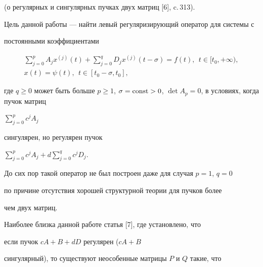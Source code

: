 (о регулярных и сингулярных пучках двух матриц [6], c.\,313).





Цель данной работы --- найти левый регуляризирующий оператор для системы с


постоянными коэффициентами


\begin{gather}


\sum_{j=0}^{p}{A_jx^{(j)}(t)}+


\sum_{j=0}^{q}{D_jx^{(j)}(t-\sigma)}=f(t),\ \ t \in [t_0,+\infty), \\


%


x(t)=\psi (t),\ \ t \in [t_0 -\sigma , t_0],


\end{gather}


где $q \ge 0$ может быть больше $p\ge 1$, $\sigma =\const >0$, $\det 


A_p=0$, в условиях, когда пучок матриц


$\sum\limits_{j=0}^{p}{c^jA_j}$


сингулярен, но регулярен пучок


$\sum\limits_{j=0}^{p}{c^jA_j} +d \sum\limits_{j=0}^{q}{c^j D_j}$.





До сих пор такой оператор не был построен даже для случая $p=1$, $q=0$


по причине отсутствия хорошей структурной теории для пучков более


чем двух матриц.





Наиболее близка данной работе статья [7], где установлено, что


если пучок $c A+B+d D$ регулярен ($c A+B$ 


сингулярный), то существуют неособенные матрицы $P$ и $Q$ такие, что


